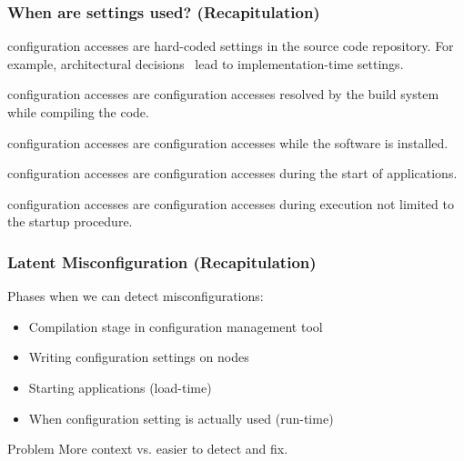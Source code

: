 \begin{frame}
	\frametitle{When are settings used? (Recapitulation)}

	\pause

	\begin{description}[<+-| alert@+>]
	\item[Implementation-time] configuration accesses 
	are hard-coded settings in the sou\-rce code repository.
	For example, architectural decisions~\cite{zdun2007patterns} lead to impl\-ementation-time settings.

	\item[Compile-time] configuration accesses 
	are configuration accesses resolved by the build system while compiling the code.

	\item[Deployment-time] configuration accesses 
	are configuration accesses while the software is installed.

	\item[Load-time] configuration accesses 
	are configuration accesses during the start of applications.

	\item[Run-time] configuration accesses 
	are configuration accesses during execution not limited to the startup procedure.
	\end{description}
\end{frame}

\begin{frame}
	\frametitle{Latent Misconfiguration (Recapitulation)}
	Phases when we can detect misconfigurations:
	\begin{itemize}[<+-| alert@+>]
	\item Compilation stage in configuration management tool
	\item Writing configuration settings on nodes
	\item Starting applications (load-time)
	\item When configuration setting is actually used (run-time)
	\end{itemize}

	\pause[\thebeamerpauses]

	\begin{alertblock}{Problem}
	More context vs. easier to detect and fix.
	\end{alertblock}
\end{frame}


